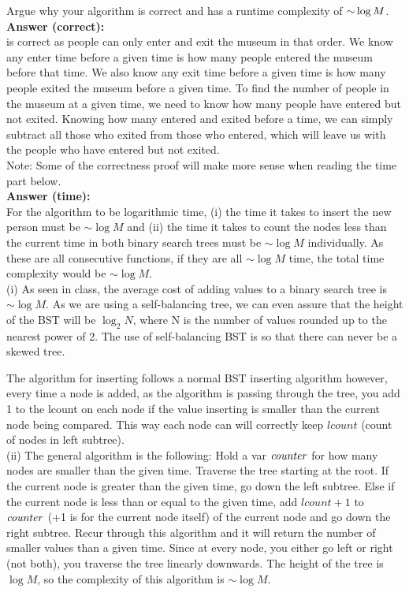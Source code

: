 \begin{problem}
\begin{questions}
\item Argue why your algorithm  is correct and has a runtime complexity of $\mathord{\sim}\log M$.\\
\textbf{Answer (correct):}\\
 is correct as people can only enter and exit the museum in that order. We know any enter time before a given time is how many people entered the museum before that time. We also know any exit time before a given time is how many people exited the museum before a given time. To find the number of people in the museum at a given time, we need to know how many people have entered but not exited. Knowing how many entered and exited before a time, we can simply subtract all those who exited from those who entered, which will leave us with the people who have entered but not exited.\\

Note: Some of the correctness proof will make more sense when reading the time part below.\\

\textbf{Answer (time):}\\
For the algorithm to be logarithmic time, (i) the time it takes to insert the new person must be $\sim \log M$ and (ii) the time it takes to count the nodes less than the current time in both binary search trees must be $\sim \log M$ individually. As these are all consecutive functions, if they are all $\sim \log M$ time, the total time complexity would be $\sim \log M$.\\

(i) As seen in class, the average cost of adding values to a binary search tree is $\sim \log M$. As we are using a self-balancing tree, we can even assure that the height of the BST will be $\log_2 N$, where N is the number of values rounded up to the nearest power of 2. The use of self-balancing BST is so that there can never be a skewed tree.

The algorithm for inserting follows a normal BST inserting algorithm however, every time a node is added, as the algorithm is passing through the tree, you add 1 to the lcount on each node if the value inserting is smaller than the current node being compared. This way each node can will correctly keep $lcount$ (count of nodes in left subtree).\\

(ii) The general algorithm is the following: Hold a var $\textit{counter\/}$ for how many nodes are smaller than the given time. Traverse the tree starting at the root. If the current node is greater than the given time, go down the left subtree. Else if the current node is less than or equal to the given time, add $lcount+1$ to $\textit{counter\/}$ (+1 is for the current node itself) of the current node and go down the right subtree. Recur through this algorithm and it will return the number of smaller values than a given time. Since at every node, you either go left or right (not both), you traverse the tree linearly downwards. The height of the tree is $\log M$, so the complexity of this algorithm is $\sim \log M$.\\


\end{questions}
\end{problem}
